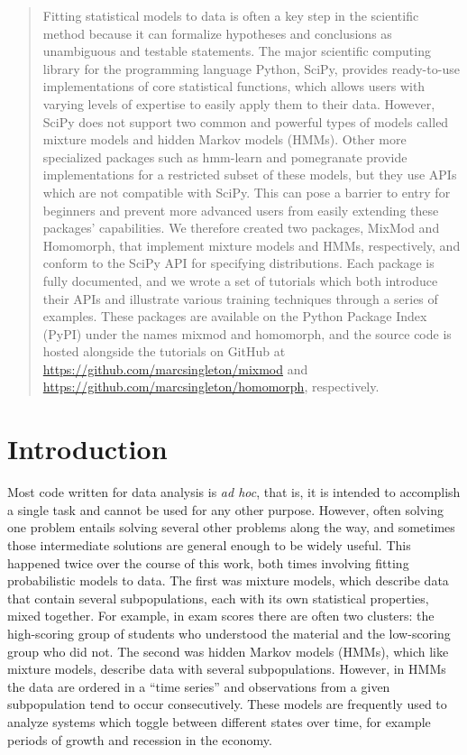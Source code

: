 \begin{abstract}
\noindent
Fitting statistical models to data is often a key step in the scientific method because it can formalize hypotheses and conclusions as unambiguous and testable statements. The major scientific computing library for the programming language Python, SciPy, provides ready-to-use implementations of core statistical functions, which allows users with varying levels of expertise to easily apply them to their data. However, SciPy does not support two common and powerful types of models called mixture models and hidden Markov models (HMMs). Other more specialized packages such as hmm-learn and pomegranate provide implementations for a restricted subset of these models, but they use APIs which are not compatible with SciPy. This can pose a barrier to entry for beginners and prevent more advanced users from easily extending these packages' capabilities. We therefore created two packages, MixMod and Homomorph, that implement mixture models and HMMs, respectively, and conform to the SciPy API for specifying distributions. Each package is fully documented, and we wrote a set of tutorials which both introduce their APIs and illustrate various training techniques through a series of examples. These packages are available on the Python Package Index (PyPI) under the names mixmod and homomorph, and the source code is hosted alongside the tutorials on GitHub at \url{https://github.com/marcsingleton/mixmod} and \url{https://github.com/marcsingleton/homomorph}, respectively.
\end{abstract}

\section{Introduction}
Most code written for data analysis is \textit{ad hoc}, that is, it is intended to accomplish a single task and cannot be used for any other purpose. However, often solving one problem entails solving several other problems along the way, and sometimes those intermediate solutions are general enough to be widely useful. This happened twice over the course of this work, both times involving fitting probabilistic models to data. The first was mixture models, which describe data that contain several subpopulations, each with its own statistical properties, mixed together. For example, in exam scores there are often two clusters: the high-scoring group of students who understood the material and the low-scoring group who did not. The second was hidden Markov models (HMMs), which like mixture models, describe data with several subpopulations. However, in HMMs the data are ordered in a ``time series'' and observations from a given subpopulation tend to occur consecutively. These models are frequently used to analyze systems which toggle between different states over time, for example periods of growth and recession in the economy.

